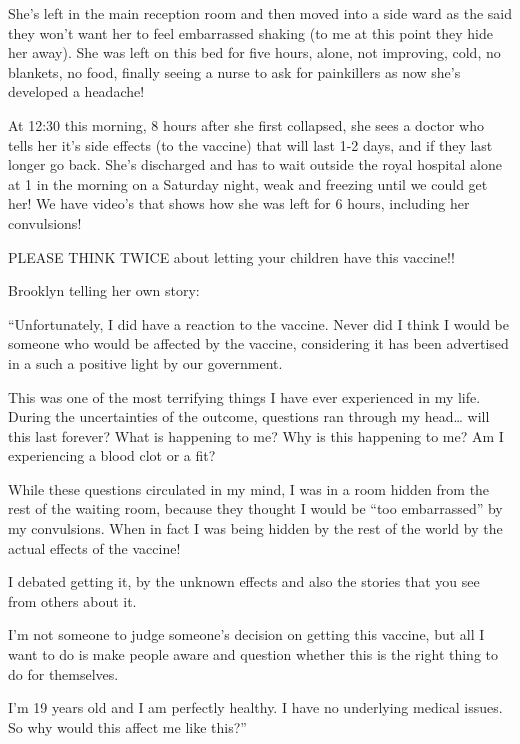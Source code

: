 {She’s left in the main reception room and then moved into a side ward as the
said they won’t want her to feel embarrassed shaking (to me at this point they
hide her away). She was left on this bed for five hours, alone, not improving,
cold, no blankets, no food, finally seeing a nurse to ask for painkillers as now
she’s developed a headache!

At 12:30 this morning, 8 hours after she first collapsed, she sees a doctor who
tells her it’s side effects (to the vaccine) that will last 1-2 days, and if
they last longer go back. She’s discharged and has to wait outside the royal
hospital alone at 1 in the morning on a Saturday night, weak and freezing until
we could get her! We have video’s that shows how she was left for 6 hours,
including her convulsions!

PLEASE THINK TWICE about letting your children have this vaccine!!

Brooklyn telling her own story:

“Unfortunately, I did have a reaction to the vaccine. Never did I think I would
be someone who would be affected by the vaccine, considering it has been
advertised in a such a positive light by our government.

This was one of the most terrifying things I have ever experienced in my
life. During the uncertainties of the outcome, questions ran through my head…
will this last forever? What is happening to me? Why is this happening to me? Am
I experiencing a blood clot or a fit?

While these questions circulated in my mind, I was in a room hidden from the
rest of the waiting room, because they thought I would be “too embarrassed” by
my convulsions. When in fact I was being hidden by the rest of the world by the
actual effects of the vaccine!

I debated getting it, by the unknown effects and also the stories that you see
from others about it.

I’m not someone to judge someone’s decision on getting this vaccine, but all I
want to do is make people aware and question whether this is the right thing to
do for themselves.

I’m 19 years old and I am perfectly healthy. I have no underlying medical
issues. So why would this affect me like this?”

}
